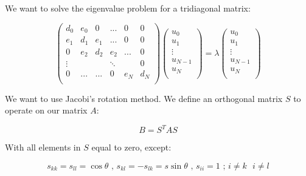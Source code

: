 \documentclass[11pt]{article}
\begin{document}
\begin{flushleft}
We want to solve the eigenvalue problem for a tridiagonal matrix:

\begin{equation}
\begin{pmatrix}
d_0 & e_0 & 0 & ... & 0 & 0 \\
e_1 & d_1 & e_1 & ... & 0 & 0\\
0 & e_2 & d_2 & e_2 & ... & 0\\
\vdots & & & \ddots &  & 0\\
0 & ... & ... & 0 & e_N & d_N\\
\end{pmatrix}
\begin{pmatrix}
u_0\\
u_1\\
\vdots\\
u_{N-1}\\
u_N\\
\end{pmatrix}
= 
\lambda
\begin{pmatrix}
u_0\\
u_1\\
\vdots\\
u_{N-1}\\
u_N\\
\end{pmatrix}
\end{equation}

We want to use Jacobi's rotation method. We define an orthogonal matrix $S$ to operate on our matrix $A$:

\begin{equation}
B = S^T A S
\end{equation}

With all elements in $S$ equal to zero, except:

\begin{equation*}
s_{kk} = s_{ll} = \cos \theta \text{ , } s_{kl} = - s_{lk} = s \sin \theta \text{ , } s_{ii} = 1 \text{ ; } i \neq k \text{ } i \neq l
\end{equation*}

\end{flushleft}
\end{document}
